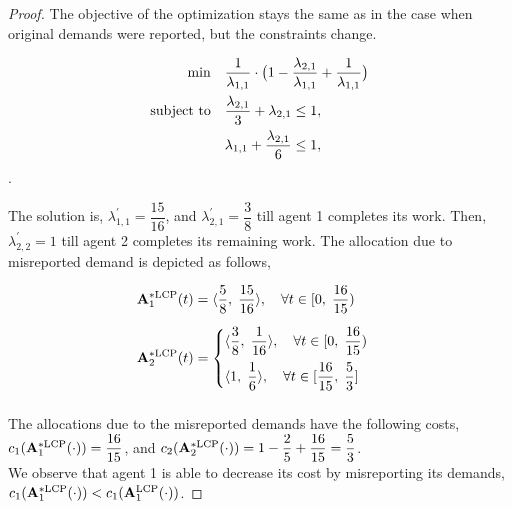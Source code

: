 \documentclass[letterpaper]{article} %
\theoremstyle{definition}
\begin{document}
\begin{proof}
The objective of the optimization stays the same as in the case when original demands were reported, but the constraints change. 
\begin{linenomath}
\begin{align*}
\min \quad & \dfrac{1}{\lambda_{1,1}}\cdot \big( 1 - \dfrac{\lambda_{2,1}}{\lambda_{1,1}} + \dfrac{1}{\lambda_{1,1}}  \big) 
\\ \textnormal{subject to} \quad & \dfrac{\lambda_{2,1}}{3} + \lambda_{2,1} \leq 1, 
\\\quad & \lambda_{1,1} + \dfrac{\lambda_{2,1}}{6} \leq 1,
\end{align*}.
\end{linenomath}

\noindent The solution is, $\lambda^{'}_{1,1} = \dfrac{15}{16}$, and $\lambda^{'}_{2,1} = \dfrac{3}{8}$ till agent 1 completes its work.  Then, $\lambda^{'}_{2,2} = 1$ till agent 2 completes its remaining work. The allocation due to misreported demand is depicted as follows, \\
\begin{linenomath}
\begin{equation*}
\begin{split}
\mathbf{A}^{*\textnormal{LCP}}_{1}(t) & = \langle \dfrac{5}{8}, \; \dfrac{15}{16} \rangle, \quad \forall t \in [0, \; \dfrac{16}{15}) \\[6 pt]
\mathbf{A}^{*\textnormal{LCP}}_{2}(t) & = \begin{cases}
\langle \dfrac{3}{8}, \; \dfrac{1}{16} \rangle, \quad \forall t \in [0, \; \dfrac{16}{15}) \\[8 pt]
\langle 1, \; \dfrac{1}{6} \rangle, \quad \forall t \in [\dfrac{16}{15}, \; \dfrac{5}{3}] \\
\end{cases}\\[6 pt] 
\end{split}    
\end{equation*}
\end{linenomath}

\noindent The allocations  due to the misreported demands have the following costs,\\ $c_{1}(\mathbf{A}^{*\textnormal{LCP}}_{1}(\cdot)) = \dfrac{16}{15}$,  and $c_{2}(\mathbf{A}^{*\textnormal{LCP}}_{2}(\cdot)) = 1 - \dfrac{2}{5} + \dfrac{16}{15} = \dfrac{5}{3}$. \\[6 pt]

\noindent We observe that agent 1 is able to decrease its cost by misreporting its demands, $c_{1}(\mathbf{A}^{*\textnormal{LCP}}_{1}(\cdot)) < c_{1}(\mathbf{A}^{\textnormal{LCP}}_{1}(\cdot))$.

\end{proof}
\end{document}
